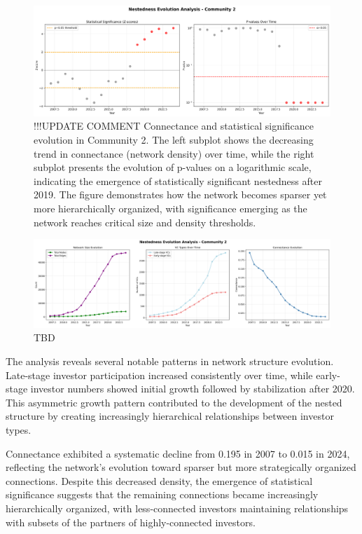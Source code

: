 \begin{figure}[htbp]
\hspace*{-1cm}\centering
\includegraphics[width=1.2\textwidth]{../figures/us/nestedness_evolution_community_2_pt2.png}
\caption{!!!UPDATE COMMENT Connectance and statistical significance evolution in Community 2. The left subplot shows the decreasing trend in connectance (network density) over time, while the right subplot presents the evolution of p-values on a logarithmic scale, indicating the emergence of statistically significant nestedness after 2019. The figure demonstrates how the network becomes sparser yet more hierarchically organized, with significance emerging as the network reaches critical size and density thresholds.}
\label{fig:connectance_evolution}
\end{figure}

\begin{figure}[htbp]
\hspace*{-1cm}\centering
\includegraphics[width=1.2\textwidth]{../figures/us/nestedness_evolution_community_2_pt3.png}
\caption{TBD}
\label{fig:connectance_evolution}
\end{figure}

The analysis reveals several notable patterns in network structure evolution. Late-stage investor participation increased consistently over time, while early-stage investor numbers showed initial growth followed by stabilization after 2020. This asymmetric growth pattern contributed to the development of the nested structure by creating increasingly hierarchical relationships between investor types.

Connectance exhibited a systematic decline from 0.195 in 2007 to 0.015 in 2024, reflecting the network's evolution toward sparser but more strategically organized connections. Despite this decreased density, the emergence of statistical significance suggests that the remaining connections became increasingly hierarchically organized, with less-connected investors maintaining relationships with subsets of the partners of highly-connected investors.

